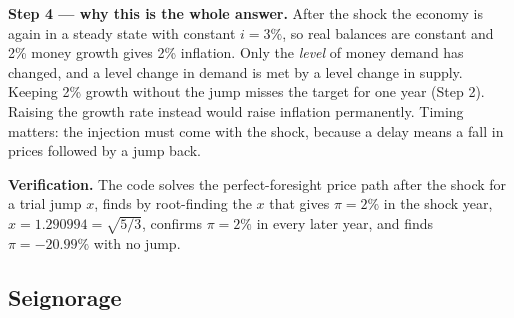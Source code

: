\documentclass[12pt, letterpaper]{article}
\begin{document}
\begin{tcolorbox}[oddbox,title={Problem 11.5 \quad Inflation Targeting}]
\begin{enumerate}
\textbf{Step 4 --- why this is the whole answer.} After the shock the economy is again in a
steady state with constant $i=3\%$, so real balances are constant and 2\% money growth gives
2\% inflation. Only the \emph{level} of money demand has changed, and a level change in demand
is met by a level change in supply. Keeping 2\% growth without the jump misses the target for
one year (Step 2). Raising the growth rate instead would raise inflation permanently.
Timing matters: the injection must come with the shock, because a delay means a fall in prices
followed by a jump back.
\end{enumerate}

\textbf{Verification.} The code solves the perfect-foresight price path after the shock for a
trial jump $x$, finds by root-finding the $x$ that gives $\pi=2\%$ in the shock year,
$x=1.290994=\sqrt{5/3}$, confirms $\pi=2\%$ in every later year, and finds $\pi=-20.99\%$ with no
jump. \checkmark
\end{tcolorbox}

\subsection{Seignorage}
\end{document}
